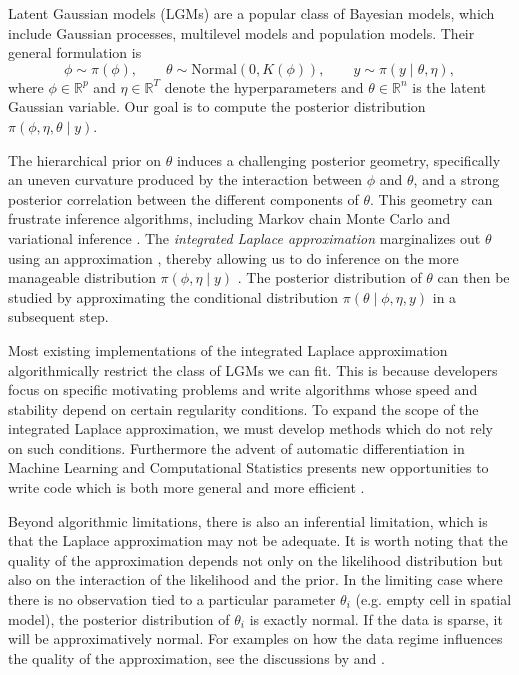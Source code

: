 \documentclass[stslayout, noinfoline]{imsart}
\theoremstyle{definition}
\begin{document}
Latent Gaussian models (LGMs) are a popular class of Bayesian models,
which include Gaussian processes, multilevel models
and population models.
Their general formulation is
$$
    \phi  \sim  \pi(\phi), \qquad 
    \theta \sim \text{Normal}(0, K(\phi)), \qquad
    y  \sim  \pi(y \mid \theta, \eta),
$$
where $\phi \in \mathbb R^p$ and $\eta \in \mathbb R^T$ denote the hyperparameters
and $\theta \in \mathbb R^n$ is the latent Gaussian variable. 
Our goal is to compute the posterior distribution \mbox{$\pi(\phi, \eta, \theta \mid y)$}.

The hierarchical prior on $\theta$ induces a challenging posterior geometry,
specifically an uneven curvature produced by the interaction between $\phi$ and $\theta$, and a strong posterior correlation between the different components of $\theta$.
This geometry can frustrate inference algorithms, including Markov chain Monte Carlo \citep{Betancourt:2015} and variational inference \citep{Zhang:2021}.
%
The \textit{integrated Laplace approximation} marginalizes out $\theta$ using an approximation \citep{Tierney:1986}, thereby allowing us to do inference on the more manageable distribution $\pi(\phi, \eta \mid y)$ \citep{Rue:2009}.
The posterior distribution of $\theta$ can then be studied by approximating the conditional distribution $\pi(\theta \mid \phi, \eta, y)$ in a subsequent step.

Most existing implementations of the integrated Laplace approximation algorithmically restrict the class of LGMs we can fit.
This is because developers focus on specific motivating problems and
write algorithms whose speed and stability depend on certain regularity conditions.
To expand the scope of the integrated Laplace approximation, we must develop methods which do not rely on such conditions.
Furthermore the advent of automatic differentiation in Machine Learning and Computational Statistics presents new opportunities to write code which is both more general and more efficient \citep{Baydin:2018, Margossian:2019, Margossian:2022-autodiff}.

Beyond algorithmic limitations, there is also an inferential limitation, which is that the Laplace approximation may not be adequate.
It is worth noting that the quality of the approximation depends not only on the likelihood distribution but also on the interaction of the likelihood and the prior.
In the limiting case where there is no observation tied to a particular parameter $\theta_i$ (e.g. empty cell in spatial model),  the posterior distribution of $\theta_i$ is exactly normal.
If the data is sparse, it will be approximatively normal.
For examples on how the data regime influences the quality of the approximation,
see the discussions by \citet{Vanhatalo:2009} and \citet{Talts:2018}.
\end{document}
